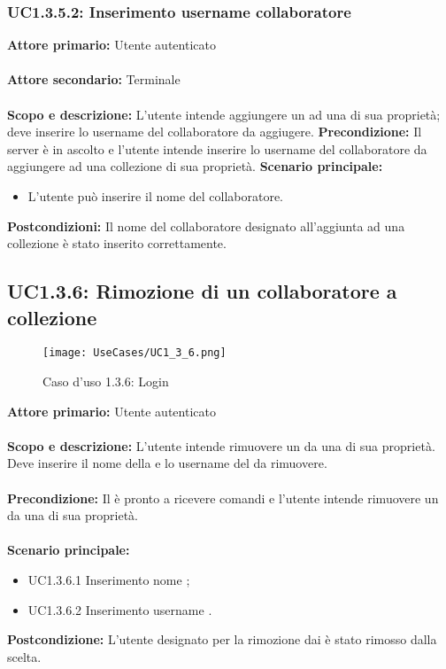 \documentclass{scalatekids-article}
\begin{document}
\subsubsection{UC1.3.5.2: Inserimento username collaboratore}

\textbf{Attore primario:} Utente autenticato\\ \\
\textbf{Attore secondario:} Terminale\\ \\
\textbf{Scopo e descrizione:} L'utente intende aggiungere un  ad una  di sua proprietà; deve inserire lo username del collaboratore da aggiugere.
\textbf{Precondizione:} Il server è in ascolto e l'utente intende inserire lo username del collaboratore da aggiungere ad una collezione di sua proprietà.
\textbf{Scenario principale:}
\begin{itemize}
\item L'utente può inserire il nome del collaboratore.
\end{itemize}
\textbf{Postcondizioni:} Il nome del collaboratore designato all'aggiunta ad una collezione è stato inserito correttamente.

\subsection{UC1.3.6: Rimozione di un collaboratore a collezione}

\begin{figure}[H]
  \begin{center}
    \texttt{[image: UseCases/UC1\_3\_6.png]}
    \caption*{Caso d'uso 1.3.6: Login}
  \end{center}
\end{figure}
\textbf{Attore primario:} Utente autenticato\\ \\
\textbf{Scopo e descrizione:} L'utente intende rimuovere un  da una  di sua proprietà. Deve inserire il nome della  e lo username del  da rimuovere.\\ \\
\textbf{Precondizione:} Il  è pronto a ricevere comandi e l'utente intende rimuovere un  da una  di sua proprietà.\\ \\
\textbf{Scenario principale:}
\begin{itemize}
\item UC1.3.6.1 Inserimento nome ;
\item UC1.3.6.2 Inserimento username .
\end{itemize}
\textbf{Postcondizione:} L'utente designato per la rimozione dai  è stato rimosso dalla  scelta.
\end{document}
